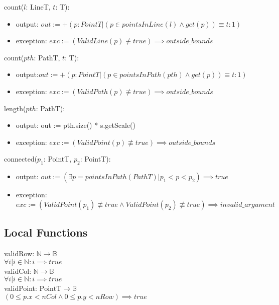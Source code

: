 \documentclass[12pt]{article}
\begin{document}
\noindent count($l$: LineT, $t$: T):
\begin{itemize}
\item output: $out := +(p : PointT | (p \in pointsInLine(l)\land get(p)) \equiv t :1)$
\item exception: $exc := (ValidLine(p) \not\equiv true) \implies outside\_bounds$
\end{itemize}

\noindent count($\mathit{pth}$: PathT, $t$: T):
\begin{itemize}
\item output:$out := +(p : PointT | (p \in pointsInPath(pth)\land get(p)) \equiv t :1)$
\item exception: $exc := (ValidPath(p) \not\equiv true) \implies outside\_bounds$
\end{itemize}

\noindent length($\mathit{pth}$: PathT):
\begin{itemize}
\item output: out := pth.size() * s.getScale()
\item exception: $exc := (ValidPoint(p) \not\equiv true) \implies outside\_bounds$
\end{itemize}

\noindent connected($p_1$: PointT, $p_2$: PointT):
\begin{itemize}
\item output: $out := (\exists p = pointsInPath(PathT)| p_1< p < p_2) \implies true$
\item exception:  $exc := (ValidPoint(p_1) \not\equiv true \land ValidPoint(p_2) \not\equiv true) \implies invalid\_argument$

\end{itemize}

\subsection*{Local Functions}

\noindent validRow: $\mathbb{N} \rightarrow \mathbb{B}$\\
\noindent $\forall i | i \in \mathbb{N} : i \implies true$\\

\noindent validCol: $\mathbb{N} \rightarrow \mathbb{B}$\\
\noindent $\forall i | i \in \mathbb{N} : i \implies true$\\

\noindent validPoint: $\mbox{PointT} \rightarrow \mathbb{B}$\\
\noindent $(0 \leq p.x < nCol \land 0 	\leq p.y < nRow) \implies true$\\
\end{document}
